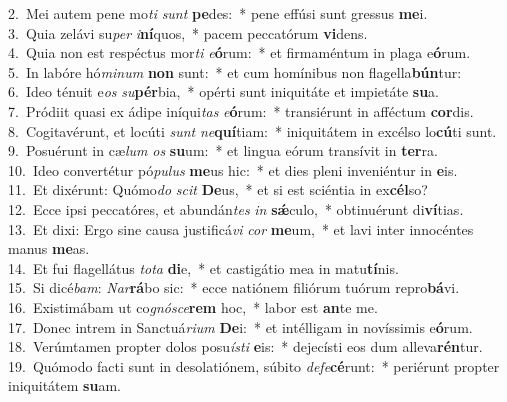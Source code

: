 {2.~}Mei autem pene mo\textit{ti} \textit{sunt} \textbf{pe}des:~* pene effúsi sunt gressus \textbf{me}i.\\
{3.~}Quia zelávi su\textit{per} \textit{i}\textbf{ní}quos,~* pacem peccatórum \textbf{vi}dens.\\
{4.~}Quia non est respéctus mor\textit{ti} \textit{e}\textbf{ó}rum:~* et firmaméntum in plaga e\textbf{ó}rum.\\
{5.~}In labóre hó\textit{mi}\textit{num} \textbf{non} sunt:~* et cum homínibus non flagella\textbf{bún}tur:\\
{6.~}Ideo ténuit e\textit{os} \textit{su}\textbf{pér}bia,~* opérti sunt iniquitáte et impietáte \textbf{su}a.\\
{7.~}Pródiit quasi ex ádipe iníqui\textit{tas} \textit{e}\textbf{ó}rum:~* transiérunt in afféctum \textbf{cor}dis.\\
{8.~}Cogitavérunt, et locúti \textit{sunt} \textit{ne}\textbf{quí}tiam:~* iniquitátem in excélso lo\textbf{cú}ti sunt.\\
{9.~}Posuérunt in cæ\textit{lum} \textit{os} \textbf{su}um:~* et lingua eórum transívit in \textbf{ter}ra.\\
{10.~}Ideo convertétur pó\textit{pu}\textit{lus} \textbf{me}us hic:~* et dies pleni inveniéntur in \textbf{e}is.\\
{11.~}Et dixérunt: Quómo\textit{do} \textit{scit} \textbf{De}us,~* et si est sciéntia in ex\textbf{cél}so?\\
{12.~}Ecce ipsi peccatóres, et abundán\textit{tes} \textit{in} \textbf{sǽ}culo,~* obtinuérunt di\textbf{ví}tias.\\
{13.~}Et dixi: Ergo sine causa justificá\textit{vi} \textit{cor} \textbf{me}um,~* et lavi inter innocéntes manus \textbf{me}as.\\
{14.~}Et fui flagellátus \textit{to}\textit{ta} \textbf{di}e,~* et castigátio mea in matu\textbf{tí}nis.\\
{15.~}Si dicé\textit{bam}: \textit{Nar}\textbf{rá}bo sic:~* ecce natiónem filiórum tuórum repro\textbf{bá}vi.\\
{16.~}Existimábam ut co\textit{gnó}\textit{sce}\textbf{rem} hoc,~* labor est \textbf{an}te me.\\
{17.~}Donec intrem in Sanctuá\textit{ri}\textit{um} \textbf{De}i:~* et intélligam in novíssimis e\textbf{ó}rum.\\
{18.~}Verúmtamen propter dolos posu\textit{í}\textit{sti} \textbf{e}is:~* dejecísti eos dum alleva\textbf{rén}tur.\\
{19.~}Quómodo facti sunt in desolatiónem, súbito \textit{de}\textit{fe}\textbf{cé}runt:~* periérunt propter iniquitátem \textbf{su}am.\\
